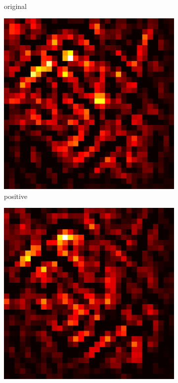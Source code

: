 \documentclass[preprint,12pt]{elsarticle}
\begin{document}
\begin{figure}
\begin{subfigure}{0.14\linewidth}
        \caption{original}
    \end{subfigure}
    \hfill
    \begin{subfigure}{0.14\textwidth}
        \centering
        \includegraphics[width=\linewidth]{../visualizations/examples/cifar10/resnet18/positive_saliency_map/6.png}
        \caption{positive}
    \end{subfigure}
    \hfill
    \begin{subfigure}{0.14\textwidth}
        \centering
        \includegraphics[width=\linewidth]{../visualizations/examples/cifar10/resnet18/negative_saliency_map/6.png}

\end{subfigure}
\end{figure}
\end{document}
